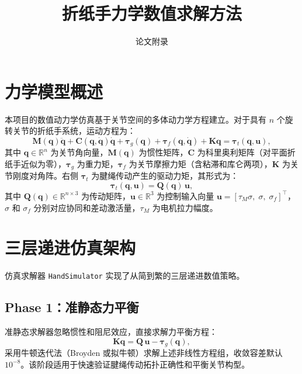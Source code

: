 \documentclass[12pt,a4paper]{article}
\title{折纸手力学数值求解方法}
\author{论文附录}
\date{}
\newcommand{\R}{\mathbb{R}}
\begin{document}
\maketitle

\section{力学模型概述}

本项目的数值动力学仿真基于关节空间的多体动力学方程建立。对于具有 $n$ 个旋转关节的折纸手系统，运动方程为：
\begin{equation}\label{eq:eom}
\mathbf{M}(\mathbf{q})\ddot{\mathbf{q}} + \mathbf{C}(\mathbf{q},\dot{\mathbf{q}})\dot{\mathbf{q}} + \boldsymbol{\tau}_g(\mathbf{q}) + \boldsymbol{\tau}_f(\mathbf{q},\dot{\mathbf{q}}) + \mathbf{K}\mathbf{q} = \boldsymbol{\tau}_t(\mathbf{q},\mathbf{u}),
\end{equation}
其中 $\mathbf{q}\in\R^n$ 为关节角向量，$\mathbf{M}(\mathbf{q})$ 为惯性矩阵，$\mathbf{C}$ 为科里奥利矩阵（对平面折纸手近似为零），$\boldsymbol{\tau}_g$ 为重力矩，$\boldsymbol{\tau}_f$ 为关节摩擦力矩（含粘滞和库仑两项），$\mathbf{K}$ 为关节刚度对角阵。右侧 $\boldsymbol{\tau}_t$ 为腱绳传动产生的驱动力矩，其形式为：
\begin{equation}\label{eq:trans}
\boldsymbol{\tau}_t(\mathbf{q},\mathbf{u}) = \mathbf{Q}(\mathbf{q})\,\mathbf{u},
\end{equation}
其中 $\mathbf{Q}(\mathbf{q})\in\R^{n\times 3}$ 为传动矩阵，$\mathbf{u}\in\R^3$ 为控制输入向量 $\mathbf{u} = [\tau_M\sigma,\;\sigma,\;\sigma_f]^\top$，$\sigma$ 和 $\sigma_f$ 分别对应协同和差动激活量，$\tau_M$ 为电机拉力幅度。

\section{三层递进仿真架构}

仿真求解器 \texttt{HandSimulator} 实现了从简到繁的三层递进数值策略。

\subsection{Phase 1：准静态力平衡}

准静态求解器忽略惯性和阻尼效应，直接求解力平衡方程：
\begin{equation}\label{eq:qs}
\mathbf{K}\mathbf{q} = \mathbf{Q}\,\mathbf{u} - \boldsymbol{\tau}_g(\mathbf{q}),
\end{equation}
采用牛顿迭代法（Broyden 或拟牛顿）求解上述非线性方程组，收敛容差默认 $10^{-8}$。该阶段适用于快速验证腱绳传动拓扑正确性和平衡关节构型。
\end{document}

